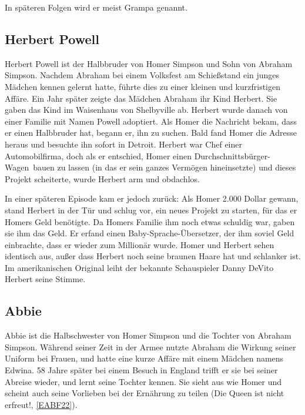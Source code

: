 In späteren Folgen wird er meist Grampa genannt.


\subsection{Herbert Powell}
Herbert Powell ist der Halbbruder von Homer Simpson und Sohn von Abraham Simpson. Nachdem Abraham bei einem Volksfest am Schießstand ein junges Mädchen kennen gelernt hatte, führte dies zu einer kleinen und kurzfristigen Affäre. Ein Jahr später zeigte das Mädchen Abraham ihr Kind Herbert. Sie gaben das Kind im Waisenhaus von Shelbyville ab. Herbert wurde danach von einer Familie mit Namen Powell adoptiert. Als Homer die Nachricht bekam, dass er einen Halbbruder hat, begann er, ihn zu suchen. Bald fand Homer die Adresse heraus und besuchte ihn sofort in Detroit. Herbert war Chef einer Automobilfirma, doch als er entschied, Homer einen \glqq Durchschnittsbürger-Wagen\grqq\ bauen zu lassen (in das er sein ganzes Vermögen hineinsetzte) und dieses Projekt scheiterte, wurde Herbert arm und obdachlos.

In einer späteren Episode kam er jedoch zurück: Als Homer 2.000 Dollar gewann, stand Herbert in der Tür und schlug vor, ein neues Projekt zu starten, für das er Homers Geld benötigte. Da Homers Familie ihm noch etwas schuldig war, gaben sie ihm das Geld. Er erfand einen \glqq Baby-Sprache-Übersetzer\grqq , der ihm soviel Geld einbrachte, dass er wieder zum Millionär wurde. Homer und Herbert sehen identisch aus, außer dass Herbert noch seine braunen Haare hat und schlanker ist. Im amerikanischen Original leiht der bekannte Schauspieler Danny DeVito Herbert seine Stimme.



\subsection{Abbie}
Abbie ist die Halbschwester von Homer Simpson und die Tochter von Abraham Simpson. Während seiner Zeit in der Armee nutzte Abraham die Wirkung seiner Uniform bei Frauen, und hatte eine kurze Affäre mit einem Mädchen namens Edwina. 58 Jahre später bei einem Besuch in England trifft er sie bei seiner Abreise wieder, und lernt seine Tochter kennen. Sie sieht aus wie Homer und scheint auch seine Vorlieben bei der Ernährung zu teilen (\glqq Die Queen ist nicht erfreut!\grqq , \ref{EABF22}).


